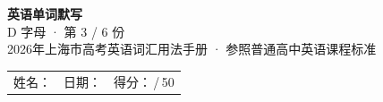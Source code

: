 \documentclass[10pt,a4paper]{article}
\begin{document}
\pagestyle{plain}

\begin{center}
{\LARGE\bfseries 英语单词默写}\\[0.22em]
{\large D 字母 · 第 3 / 6 份}\\[0.18em]
{\small 2026年上海市高考英语词汇用法手册 · 参照普通高中英语课程标准}
\end{center}

\vspace{0.25em}
\noindent\begin{tabular}{@{}p{}@{}p{}@{}p{}@{}}
姓名：\underline{\hspace{2.0cm}} & 日期：\underline{\hspace{2.0cm}} & 得分：\underline{\hspace{1.3cm}}\,/\,50 \\
\end{tabular}

\vspace{0.3em}

\vspace{0.08em}
\end{document}
